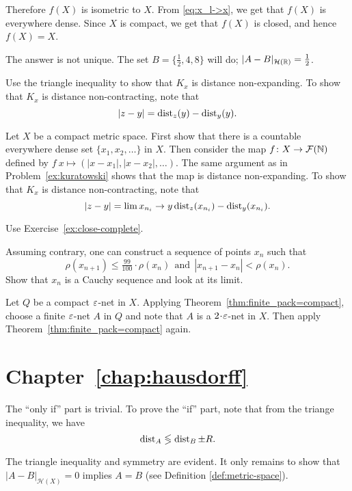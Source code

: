 Therefore $f(X)$ is isometric to $X$.
From \ref{eq:x_l->x}, we get that $f(X)$ is everywhere dense.
Since $X$ is compact, we get that $f(X)$ is closed, and hence $f(X)=X$.



 The answer is not unique.
The set $B=\{\tfrac12,4,8\}$ will do; $|A-B|_{\mathcal{H}(\mathbb{R})}=\tfrac12$.


 Use the triangle inequality to show that $K_x$ is distance non-expanding.
To show that $K_x$ is distance non-contracting, note that 
$$|z-y|=\operatorname{dist}_z(y)-\operatorname{dist}_y(y).$$


Let $X$ be a compact metric space.
First show that there is a countable everywhere dense set $\{x_1,x_2,\dots\}$ in $X$.
Then consider the map $f\colon X\to \mathcal{F}(\mathbb{N})$ defined by $f\:x\mapsto (|x-x_1|,|x-x_2|,\dots)$.
The same argument as in Problem~\ref{ex:kuratowski} shows that the map is distance non-expanding.
To show that $K_x$ is distance non-contracting, note that 
$$|z-y|=\lim{x_{n_i}\to y}\operatorname{dist}_z(x_{n_i})-\operatorname{dist}_y(x_{n_i}).$$


 Use Exercise~\ref{ex:close-complete}.


 Assuming contrary, one can construct a sequence of points $x_n$ such that
$$\rho(x_{n+1})\le \tfrac{99}{100}\cdot\rho(x_n)\ \ \text{and}\ \ |x_{n+1}-x_n|<\rho(x_n).$$
Show that $x_n$ is a Cauchy sequence and look at its limit.


 Let $Q$ be a compact $\varepsilon$-net in $X$.
Applying Theorem~\ref{thm:finite_pack=compact}, choose a finite $\varepsilon$-net $A$ in $Q$ and note that $A$ is a $2\cdot\eps$-net in $X$.
Then apply Theorem~\ref{thm:finite_pack=compact} again.

\section*{Chapter~\ref{chap:hausdorff}}

The ``only if'' part is trivial. 
To prove the ``if'' part, note that from the triange inequality,
we have 
$$\Dist_A\lege \Dist_B\pm R.$$


The triangle inequality and symmetry are evident.
It only remains to show that $|A-B|_{\mathcal{H}(X)}=0$ implies $A=B$ (see Definition \ref{def:metric-space}).


